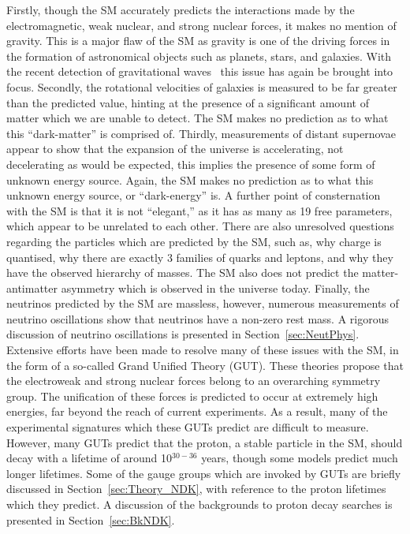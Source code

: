 Firstly, though the SM accurately predicts the interactions made by the electromagnetic, weak nuclear, and strong nuclear forces, it makes no mention of gravity. This is a major flaw of the SM as gravity is one of the driving forces in the formation of astronomical objects such as planets, stars, and galaxies. With the recent detection of gravitational waves~\citep{LIGO} this issue has again be brought into focus. Secondly, the rotational velocities of galaxies is measured to be far greater than the predicted value, hinting at the presence of a significant amount of matter which we are unable to detect. The SM makes no prediction as to what this ``dark-matter'' is comprised of. Thirdly, measurements of distant supernovae appear to show that the expansion of the universe is accelerating, not decelerating as would be expected, this implies the presence of some form of unknown energy source. Again, the SM makes no prediction as to what this unknown energy source, or ``dark-energy'' is. A further point of consternation with the SM is that it is not ``elegant,'' as it has as many as 19 free parameters, which appear to be unrelated to each other. There are also unresolved questions regarding the particles which are predicted by the SM, such as, why charge is quantised, why there are exactly 3 families of quarks and leptons, and why they have the observed hierarchy of masses. The SM also does not predict the matter-antimatter asymmetry which is observed in the universe today. Finally, the neutrinos predicted by the SM are massless, however, numerous measurements of neutrino oscillations show that neutrinos have a non-zero rest mass. A rigorous discussion of neutrino oscillations is presented in Section~\ref{sec:NeutPhys}. \\

Extensive efforts have been made to resolve many of these issues with the SM, in the form of a so-called Grand Unified Theory (GUT). These theories propose that the electroweak and strong nuclear forces belong to an overarching symmetry group. The unification of these forces is predicted to occur at extremely high energies, far beyond the reach of current experiments. As a result, many of the experimental signatures which these GUTs predict are difficult to measure. However, many GUTs predict that the proton, a stable particle in the SM, should decay with a lifetime of around 10$^{30-36}$ years, though some models predict much longer lifetimes. Some of the gauge groups which are invoked by GUTs are briefly discussed in Section~\ref{sec:Theory_NDK}, with reference to the proton lifetimes which they predict. A discussion of the backgrounds to proton decay searches is presented in Section~\ref{sec:BkNDK}. \\

